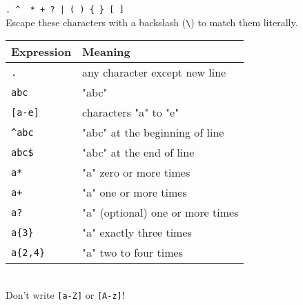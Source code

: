 \documentclass[a4paper,10pt]{article}
\begin{document}
\pagestyle{fancy}

\fancyhead{}\fancyfoot{}


\begin{multicols}{2}
    \begin{tcolorbox}[colback=white, colframe=black, title=Metacharacters]
        \texttt{.\ \textasciicircum\ \textdollar\ * + ?\ | ( ) \{ \} [ ]} \\[5mm]
        Escape these characters with a backslash (\texttt{\textbackslash}) to match them literally.
    \end{tcolorbox}

    \begin{tcolorbox}[colback=white, colframe=black, title=Basic Expressions]
        \renewcommand{\arraystretch}{1.3}
        \centering
        \begin{tabular}{p{2cm}p{5cm}}
            \hline
            \textbf{Expression} & \textbf{Meaning}                     \\
            \hline
            \texttt{.}        & any character except new line \\
            \texttt{abc}      & "abc"                              \\
            \texttt{[a-e]}    & characters "a" to "e"                \\
            \texttt{\textasciicircum abc}    & "abc" at the beginning of line              \\
            \texttt{abc\$}    & "abc" at the end of line                \\
            \texttt{a*}       & "a" zero or more times                 \\
            \texttt{a+}       & "a" one or more times               \\
            \texttt{a?}       & "a" (optional) one or more times                   \\
            \texttt{a\{3\}}   & "a" exactly three times                      \\
            \texttt{a\{2,4\}} & "a" two to four times                   \\
        \end{tabular}\\[5mm]
        Don't write \texttt{[a-Z]} or \texttt{[A-z]}!
    \end{tcolorbox}


\end{multicols}
\end{document}
